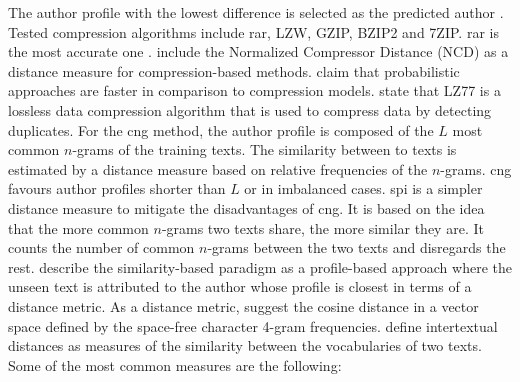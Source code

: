 The author profile with the lowest difference is selected as the predicted author \citep{stamatatos_survey_2009,elmanarelbouanani_authorship_2014}.
Tested compression algorithms include \ac{rar}, LZW, GZIP, BZIP2 and 7ZIP. 
\ac{rar} is the most accurate one \citep{elmanarelbouanani_authorship_2014}.
\citet{elmanarelbouanani_authorship_2014} include the Normalized Compressor Distance (NCD) as a distance measure for compression-based methods. %
\citet{stamatatos_survey_2009} claim that probabilistic approaches are faster in comparison to compression models.
\citet{neal_surveying_2018} state that LZ77 is a lossless data compression algorithm that is used to compress data by detecting duplicates.
For the \ac{cng} method, the author profile is composed of the $L$ most common $n$-grams of the training texts.
The similarity between to texts is estimated by a distance measure based on relative frequencies of the $n$-grams.
\ac{cng} favours author profiles shorter than $L$ or in imbalanced cases.
\ac{spi} is a simpler distance measure to mitigate the disadvantages of \ac{cng}.
It is based on the idea that the more common $n$-grams two texts share, the more similar they are.
It counts the number of common $n$-grams between the two texts and disregards the rest.
\citep{koppel_authorship_2011} describe the similarity-based paradigm as a profile-based approach 
where the unseen text is attributed to the author whose profile is closest in terms of a distance metric.
As a distance metric, \citet{koppel_authorship_2011} suggest the cosine distance in a vector space 
defined by the space-free character 4-gram frequencies.
\citet{neal_surveying_2018} define intertextual distances as measures of the similarity between the vocabularies of two texts.
Some of the most common measures are the following:
